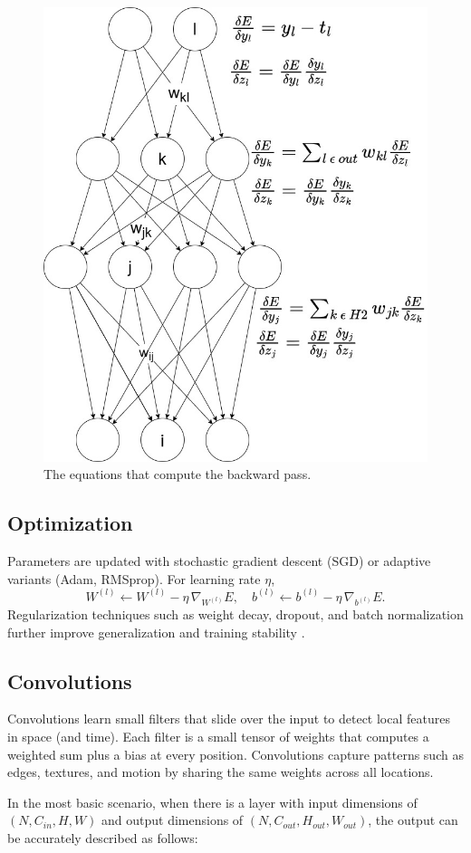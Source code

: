 \begin{figure}[ht]
    \centering
    \includegraphics[width=0.6\linewidth]{figures/neural_net_back_prop.jpg}
    \caption{The equations that compute the backward pass.}
    \label{fig:backward_pass}
\end{figure}

\subsection{Optimization}
Parameters are updated with stochastic gradient descent (SGD) or adaptive variants (Adam, RMSprop). For learning rate \(\eta\),
\[
W^{(l)} \leftarrow W^{(l)} - \eta\,\nabla_{W^{(l)}}E,
\quad
b^{(l)} \leftarrow b^{(l)} - \eta\,\nabla_{b^{(l)}}E.
\]
Regularization techniques such as weight decay, dropout, and batch normalization further improve generalization and training stability \cite{ioffe_batch_2015}.

\subsection{Convolutions}

Convolutions learn small filters that slide over the input to detect local features in space (and time). Each filter is a small tensor of weights that computes a weighted sum plus a bias at every position. Convolutions capture patterns such as edges, textures, and motion by sharing the same weights across all locations.  

In the most basic scenario, when there is a layer with input dimensions of \( (N, C_{in}, H, W)\) and output dimensions of \( (N, C_{out}, H_{out}, W_{out})\), the output can be accurately described as follows:

